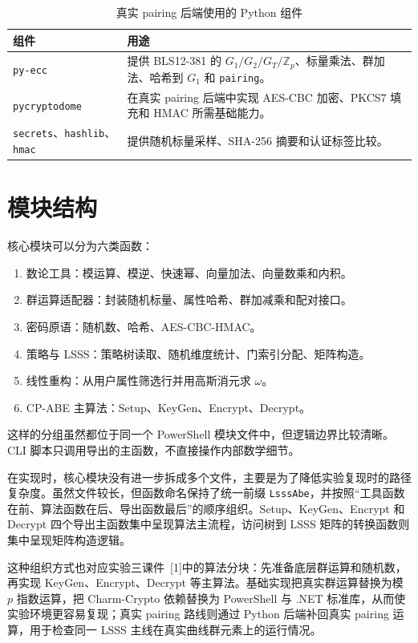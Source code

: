 \begin{table}[H]
\centering
\caption{真实 pairing 后端使用的 Python 组件}
\label{tab:python-pairing-deps}
\begin{tabular}{p{} p{}}
\toprule
组件 & 用途 \\
\midrule
\verb|py-ecc| & 提供 BLS12-381 的 $G_1/G_2/G_T/\mathbb{Z}_p$、标量乘法、群加法、哈希到 $G_1$ 和 \verb|pairing|。\\
\verb|pycryptodome| & 在真实 pairing 后端中实现 AES-CBC 加密、PKCS7 填充和 HMAC 所需基础能力。\\
\verb|secrets|、\verb|hashlib|、\verb|hmac| & 提供随机标量采样、SHA-256 摘要和认证标签比较。\\
\bottomrule
\end{tabular}
\end{table}

\section{模块结构}

核心模块可以分为六类函数：

\begin{enumerate}
    \item 数论工具：模运算、模逆、快速幂、向量加法、向量数乘和内积。
    \item 群运算适配器：封装随机标量、属性哈希、群加减乘和配对接口。
    \item 密码原语：随机数、哈希、AES-CBC-HMAC。
    \item 策略与 LSSS：策略树读取、随机维度统计、门索引分配、矩阵构造。
    \item 线性重构：从用户属性筛选行并用高斯消元求 $\omega$。
    \item CP-ABE 主算法：Setup、KeyGen、Encrypt、Decrypt。
\end{enumerate}

这样的分组虽然都位于同一个 PowerShell 模块文件中，但逻辑边界比较清晰。CLI 脚本只调用导出的主函数，不直接操作内部数学细节。

在实现时，核心模块没有进一步拆成多个文件，主要是为了降低实验复现时的路径复杂度。虽然文件较长，但函数命名保持了统一前缀 \verb|LsssAbe|，并按照“工具函数在前、算法函数在后、导出函数最后”的顺序组织。Setup、KeyGen、Encrypt 和 Decrypt 四个导出主函数集中呈现算法主流程，访问树到 LSSS 矩阵的转换函数则集中呈现矩阵构造逻辑。

这种组织方式也对应实验三课件~[1]中的算法分块：先准备底层群运算和随机数，再实现 KeyGen、Encrypt、Decrypt 等主算法。基础实现把真实群运算替换为模 $p$ 指数运算，把 Charm-Crypto 依赖替换为 PowerShell 与 .NET 标准库，从而使实验环境更容易复现；真实 pairing 路线则通过 Python 后端补回真实 pairing 运算，用于检查同一 LSSS 主线在真实曲线群元素上的运行情况。

